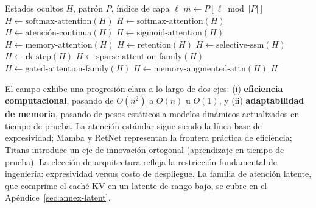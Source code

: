 \begin{algorithm}[t]
\caption{Paso Adelante del Mezclador Guiado por Patrón (Conceptual)}
\begin{algorithmic}[1]
\Require Estados ocultos $H$, patrón $P$, índice de capa $\ell$
\State $m \gets P[\ell \bmod |P|]$
    \State $H \gets \text{softmax-attention}(H)$ 
    \State $H \gets \text{softmax-attention}(H)$
    \State $H \gets \text{atención-continua}(H)$ 
    \State $H \gets \text{sigmoid-attention}(H)$
    \State $H \gets \text{memory-attention}(H)$
    \State $H \gets \text{retention}(H)$
    \State $H \gets \text{selective-ssm}(H)$
    \State $H \gets \text{rk-step}(H)$
    \State $H \gets \text{sparse-attention-family}(H)$
    \State $H \gets \text{gated-attention-family}(H)$
\Else
    \State $H \gets \text{memory-augmented-attn}(H)$
\EndIf
\State \Return $H$
\end{algorithmic}
\end{algorithm}

El campo exhibe una progresión clara a lo largo de dos ejes: (i) \textbf{eficiencia computacional}, pasando de $O(n^2)$ a $O(n)$ u $O(1)$, y (ii) \textbf{adaptabilidad de memoria}, pasando de pesos estáticos a modelos dinámicos actualizados en tiempo de prueba. La atención estándar sigue siendo la línea base de expresividad; Mamba y RetNet representan la frontera práctica de eficiencia; Titans introduce un eje de innovación ortogonal (aprendizaje en tiempo de prueba). La elección de arquitectura refleja la restricción fundamental de ingeniería: expresividad versus costo de despliegue. La familia de atención latente, que comprime el caché KV en un latente de rango bajo, se cubre en el Apéndice~\ref{sec:annex-latent}.